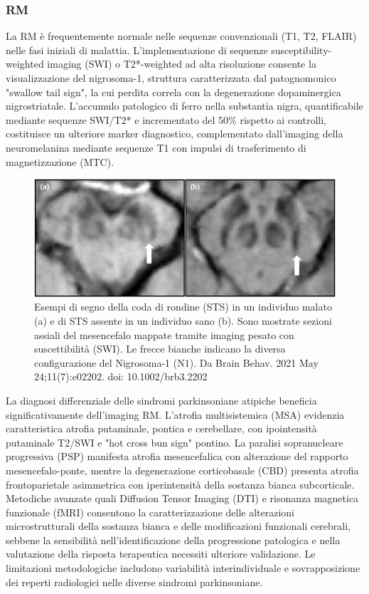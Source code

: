 \subsubsection{RM}
La RM è frequentemente normale nelle sequenze convenzionali (T1, T2, FLAIR) nelle fasi iniziali di malattia. L'implementazione di sequenze susceptibility-weighted imaging (SWI) o T2*-weighted ad alta risoluzione consente la visualizzazione del nigrosoma-1, struttura caratterizzata dal patognomonico "swallow tail sign", la cui perdita correla con la degenerazione dopaminergica nigrostriatale. L'accumulo patologico di ferro nella substantia nigra, quantificabile mediante sequenze SWI/T2* e incrementato del 50\% rispetto ai controlli, costituisce un ulteriore marker diagnostico, complementato dall'imaging della neuromelanina mediante sequenze T1 con impulsi di trasferimento di magnetizzazione (MTC).

\begin{figure}[h]
	\centering
	\includegraphics[width=0.8\linewidth]{FileAusiliari/Immagini/degenerative/BRB3-11-e02202-g002}
	\caption[Swallow-tail sign Parkinson]{Esempi di segno della coda di rondine (STS) in un individuo malato (a) e di STS assente in un individuo sano (b). Sono mostrate sezioni assiali del mesencefalo mappate tramite imaging pesato con suscettibilità (SWI). Le frecce bianche indicano la diversa configurazione del Nigrosoma-1 (N1). Da Brain Behav. 2021 May 24;11(7):e02202. doi: 10.1002/brb3.2202}
	\label{fig:brb3-11-e02202-g002}
\end{figure}

La diagnosi differenziale delle sindromi parkinsoniane atipiche beneficia significativamente dell'imaging RM. L'atrofia multisistemica (MSA) evidenzia caratteristica atrofia putaminale, pontica e cerebellare, con ipointensità putaminale T2/SWI e "hot cross bun sign" pontino. La paralisi sopranucleare progressiva (PSP) manifesta atrofia mesencefalica con alterazione del rapporto mesencefalo-ponte, mentre la degenerazione corticobasale (CBD) presenta atrofia frontoparietale asimmetrica con iperintensità della sostanza bianca subcorticale.
Metodiche avanzate quali Diffusion Tensor Imaging (DTI) e risonanza magnetica funzionale (fMRI) consentono la caratterizzazione delle alterazioni microstrutturali della sostanza bianca e delle modificazioni funzionali cerebrali, sebbene la sensibilità nell'identificazione della progressione patologica e nella valutazione della risposta terapeutica necessiti ulteriore validazione. Le limitazioni metodologiche includono variabilità interindividuale e sovrapposizione dei reperti radiologici nelle diverse sindromi parkinsoniane.

